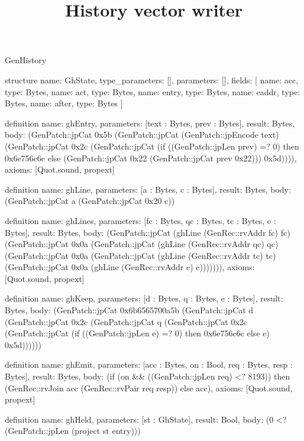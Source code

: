 \begin{lexlean}{GenHistory}
\title{History vector writer}
\begin{semanticmodule}
structure{
  name: GhState,
  type_parameters: [],
  parameters: [],
  fields: [
    {name: acc, type: Bytes},
    {name: act, type: Bytes},
    {name: entry, type: Bytes},
    {name: eaddr, type: Bytes},
    {name: after, type: Bytes}
  ]
}

definition{
  name: ghEntry,
  parameters: [text : Bytes, prev : Bytes],
  result: Bytes,
  body: (GenPatch::jpCat 0x5b (GenPatch::jpCat (GenPatch::jpEncode text) (GenPatch::jpCat 0x2c (GenPatch::jpCat (if ((GenPatch::jpLen prev) =? 0) then 0x6e756c6c else (GenPatch::jpCat 0x22 (GenPatch::jpCat prev 0x22))) 0x5d)))),
  axioms: [Quot.sound, propext]
}

definition{
  name: ghLine,
  parameters: [a : Bytes, c : Bytes],
  result: Bytes,
  body: (GenPatch::jpCat a (GenPatch::jpCat 0x20 c))
}

definition{
  name: ghLines,
  parameters: [fc : Bytes, qc : Bytes, tc : Bytes, e : Bytes],
  result: Bytes,
  body: (GenPatch::jpCat (ghLine (GenRec::rvAddr fc) fc) (GenPatch::jpCat 0x0a (GenPatch::jpCat (ghLine (GenRec::rvAddr qc) qc) (GenPatch::jpCat 0x0a (GenPatch::jpCat (ghLine (GenRec::rvAddr tc) tc) (GenPatch::jpCat 0x0a (ghLine (GenRec::rvAddr e) e))))))),
  axioms: [Quot.sound, propext]
}

definition{
  name: ghKeep,
  parameters: [d : Bytes, q : Bytes, e : Bytes],
  result: Bytes,
  body: (GenPatch::jpCat 0x6b6565700a5b (GenPatch::jpCat d (GenPatch::jpCat 0x2c (GenPatch::jpCat q (GenPatch::jpCat 0x2c (GenPatch::jpCat (if ((GenPatch::jpLen e) =? 0) then 0x6e756c6c else e) 0x5d))))))
}

definition{
  name: ghEmit,
  parameters: [acc : Bytes, on : Bool, req : Bytes, resp : Bytes],
  result: Bytes,
  body: (if (on && ((GenPatch::jpLen req) <? 8193)) then (GenRec::rvJoin acc (GenRec::rvPair req resp)) else acc),
  axioms: [Quot.sound, propext]
}

definition{
  name: ghHeld,
  parameters: [st : GhState],
  result: Bool,
  body: (0 <? (GenPatch::jpLen (project st entry)))
}


\end{semanticmodule}
\end{lexlean}
